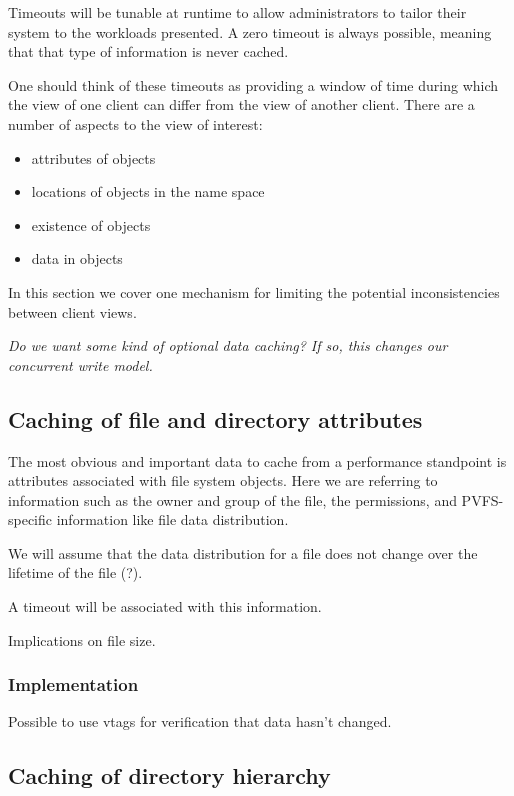 \documentclass[10pt]{article} %
\begin{document}
Timeouts will be tunable at runtime to allow administrators to tailor their
system to the workloads presented.  A zero timeout is always possible, meaning
that that type of information is never cached.

One should think of these timeouts as providing a window of time during which
the view of one client can differ from the view of another client.  There are
a number of aspects to the view of interest:
\begin{itemize}
\item attributes of objects
\item locations of objects in the name space
\item existence of objects
\item data in objects
\end{itemize}

In this section we cover one mechanism for limiting the potential
inconsistencies between client views.

\emph{Do we want some kind of optional data caching?  If so, this changes our
concurrent write model.}

%
%
\subsection{Caching of file and directory attributes}

The most obvious and important data to cache from a performance standpoint is
attributes associated with file system objects.  Here we are referring to
information such as the owner and group of the file, the permissions, and
PVFS-specific information like file data distribution.

We will assume that the data distribution for a file does not change
over the lifetime of the file (?).

A timeout will be associated with this information.

Implications on file size.

\subsubsection{Implementation}

Possible to use vtags for verification that data hasn't changed.

%
%
\subsection{Caching of directory hierarchy}
\end{document}
